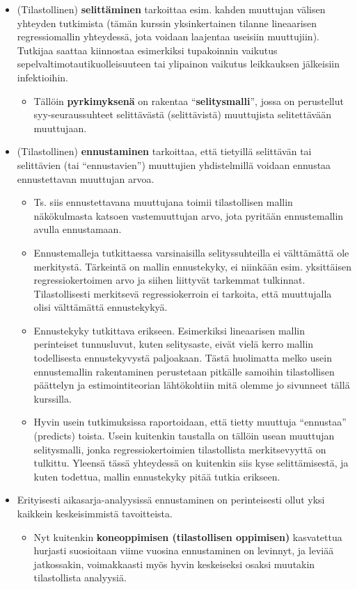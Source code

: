 \documentclass[
]{book}
\providecommand{\tightlist}{%
  \setlength{\itemsep}{0pt}\setlength{\parskip}{0pt}}
\begin{document}
\begin{itemize}
\tightlist
\item
  (Tilastollinen) \textbf{selittäminen} tarkoittaa esim. kahden muuttujan välisen yhteyden tutkimista (tämän kurssin yksinkertainen tilanne lineaarisen regressiomallin yhteydessä, jota voidaan laajentaa useisiin muuttujiin). Tutkijaa saattaa kiinnostaa esimerkiksi tupakoinnin vaikutus sepelvaltimotautikuolleisuuteen tai ylipainon vaikutus leikkauksen jälkeisiin infektioihin.

  \begin{itemize}
  \tightlist
  \item
    Tällöin \textbf{pyrkimyksenä} on rakentaa ``\textbf{selitysmalli}'', jossa on perustellut syy-seuraussuhteet selittävästä (selittävistä) muuttujista selitettävään muuttujaan.
  \end{itemize}
\item
  (Tilastollinen) \textbf{ennustaminen} tarkoittaa, että tietyillä selittävän tai selittävien (tai ``ennustavien'') muuttujien yhdistelmillä voidaan ennustaa ennustettavan muuttujan arvoa.

  \begin{itemize}
  \tightlist
  \item
    Ts. siis ennustettavana muuttujana toimii tilastollisen mallin näkökulmasta katsoen vastemuuttujan arvo, jota pyritään ennustemallin avulla ennustamaan.
  \item
    Ennustemalleja tutkittaessa varsinaisilla selityssuhteilla ei välttämättä ole merkitystä. Tärkeintä on mallin ennustekyky, ei niinkään esim. yksittäisen regressiokertoimen arvo ja siihen liittyvät tarkemmat tulkinnat. Tilastollisesti merkitsevä regressiokerroin ei tarkoita, että muuttujalla olisi välttämättä ennustekykyä.
  \item
    Ennustekyky tutkittava erikseen. Esimerkiksi lineaarisen mallin perinteiset tunnusluvut, kuten selitysaste, eivät vielä kerro mallin todellisesta ennustekyvystä paljoakaan. Tästä huolimatta melko usein ennustemallin rakentaminen perustetaan pitkälle samoihin tilastollisen päättelyn ja estimointiteorian lähtökohtiin mitä olemme jo sivunneet tällä kurssilla.
  \item
    Hyvin usein tutkimuksissa raportoidaan, että tietty muuttuja ``ennustaa'' (predicts) toista. Usein kuitenkin taustalla on tällöin usean muuttujan selitysmalli, jonka regressiokertoimien tilastollista merkitsevyyttä on tulkittu. Yleensä tässä yhteydessä on kuitenkin siis kyse selittämisestä, ja kuten todettua, mallin ennustekyky pitää tutkia erikseen.
  \end{itemize}
\item
  Erityisesti aikasarja-analyysissä ennustaminen on perinteisesti ollut yksi kaikkein keskeisimmistä tavoitteista.

  \begin{itemize}
  \tightlist
  \item
    Nyt kuitenkin \textbf{koneoppimisen (tilastollisen oppimisen)} kasvatettua hurjasti suosioitaan viime vuosina ennustaminen on levinnyt, ja leviää jatkossakin, voimakkaasti myös hyvin keskeiseksi osaksi muutakin tilastollista analyysiä.
  \end{itemize}
\end{itemize}
\end{document}
